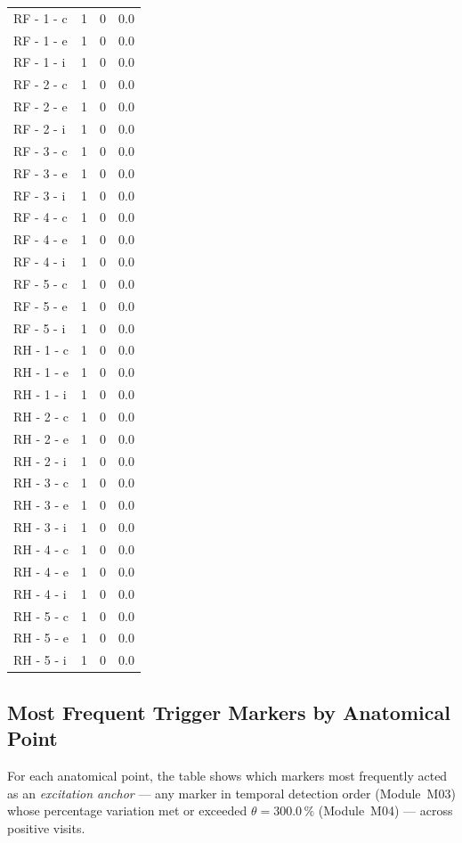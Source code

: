 \documentclass[a4paper,11pt]{article}
\begin{document}
\begin{small}
\begin{longtable}{p{5cm}rrr}
RF - 1 - c & 1 & 0 & 0.0 \\
RF - 1 - e & 1 & 0 & 0.0 \\
RF - 1 - i & 1 & 0 & 0.0 \\
RF - 2 - c & 1 & 0 & 0.0 \\
RF - 2 - e & 1 & 0 & 0.0 \\
RF - 2 - i & 1 & 0 & 0.0 \\
RF - 3 - c & 1 & 0 & 0.0 \\
RF - 3 - e & 1 & 0 & 0.0 \\
RF - 3 - i & 1 & 0 & 0.0 \\
RF - 4 - c & 1 & 0 & 0.0 \\
RF - 4 - e & 1 & 0 & 0.0 \\
RF - 4 - i & 1 & 0 & 0.0 \\
RF - 5 - c & 1 & 0 & 0.0 \\
RF - 5 - e & 1 & 0 & 0.0 \\
RF - 5 - i & 1 & 0 & 0.0 \\
RH - 1 - c & 1 & 0 & 0.0 \\
RH - 1 - e & 1 & 0 & 0.0 \\
RH - 1 - i & 1 & 0 & 0.0 \\
RH - 2 - c & 1 & 0 & 0.0 \\
RH - 2 - e & 1 & 0 & 0.0 \\
RH - 2 - i & 1 & 0 & 0.0 \\
RH - 3 - c & 1 & 0 & 0.0 \\
RH - 3 - e & 1 & 0 & 0.0 \\
RH - 3 - i & 1 & 0 & 0.0 \\
RH - 4 - c & 1 & 0 & 0.0 \\
RH - 4 - e & 1 & 0 & 0.0 \\
RH - 4 - i & 1 & 0 & 0.0 \\
RH - 5 - c & 1 & 0 & 0.0 \\
RH - 5 - e & 1 & 0 & 0.0 \\
RH - 5 - i & 1 & 0 & 0.0 \\
\end{longtable}
\end{small}

\subsection{Most Frequent Trigger Markers by Anatomical Point}

For each anatomical point, the table shows which markers most frequently acted as an
\emph{excitation anchor} --- any marker in temporal detection order (Module~M03)
whose percentage variation met or exceeded $\theta = 300.0\,\%$
(Module~M04) --- across positive visits.
\end{document}
